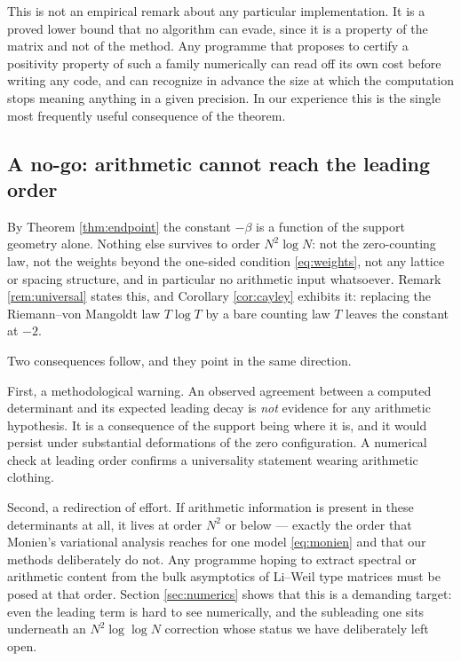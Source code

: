 \documentclass[11pt]{amsart}
\numberwithin{equation}{section}
\theoremstyle{plain}
\theoremstyle{definition}
\theoremstyle{remark}
\begin{document}
This is not an empirical remark about any particular implementation. It is a proved lower bound
that no algorithm can evade, since it is a property of the matrix and not of the method. Any
programme that proposes to certify a positivity property of such a family numerically can read off
its own cost before writing any code, and can recognize in advance the size at which the
computation stops meaning anything in a given precision. In our experience this is the single most
frequently useful consequence of the theorem.

\subsection{A no-go: arithmetic cannot reach the leading order}
\label{ss:nogo}

By Theorem \ref{thm:endpoint} the constant $-\beta$ is a function of the support geometry alone.
Nothing else survives to order $N^{2}\log N$: not the zero-counting law, not the weights beyond the
one-sided condition \eqref{eq:weights}, not any lattice or spacing structure, and in particular no
arithmetic input whatsoever. Remark \ref{rem:universal} states this, and Corollary
\ref{cor:cayley} exhibits it: replacing the Riemann--von Mangoldt law $T\log T$ by a bare counting
law $T$ leaves the constant at $-2$.

Two consequences follow, and they point in the same direction.

First, a methodological warning. An observed agreement between a computed determinant and its
expected leading decay is \emph{not} evidence for any arithmetic hypothesis. It is a consequence of
the support being where it is, and it would persist under substantial deformations of the zero
configuration. A numerical check at leading order confirms a universality statement wearing
arithmetic clothing.

Second, a redirection of effort. If arithmetic information is present in these determinants at all,
it lives at order $N^{2}$ or below --- exactly the order that Monien's variational analysis reaches
for one model \eqref{eq:monien} and that our methods deliberately do not. Any programme hoping to
extract spectral or arithmetic content from the bulk asymptotics of Li--Weil type matrices must be
posed at that order. Section \ref{sec:numerics} shows that this is a demanding target: even the
leading term is hard to see numerically, and the subleading one sits underneath an
$N^{2}\log\log N$ correction whose status we have deliberately left open.
\end{document}
